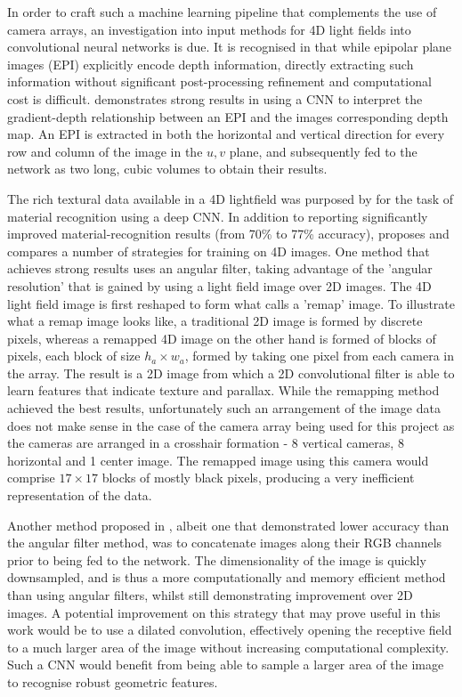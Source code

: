 \documentclass[openany]{book}
\begin{document}
In order to craft such a machine learning pipeline that complements the use of camera arrays, an investigation into input methods for 4D light fields into convolutional neural networks is due. It is recognised in \cite{sun2016lfdepthcnn} that while epipolar plane images (EPI) explicitly encode depth information, directly extracting such information without significant post-processing refinement and computational cost is difficult. \cite{sun2016lfdepthcnn} demonstrates strong results in using a CNN to interpret the gradient-depth relationship between an EPI and the images corresponding depth map. An EPI is extracted in both the horizontal and vertical direction for every row and column of the image in the $u, v$ plane, and subsequently fed to the network as two long, cubic volumes to obtain their results.

The rich textural data available in a 4D lightfield was purposed by \cite{wang2016lfcnn} for the task of material recognition using a deep CNN. In addition to reporting significantly improved material-recognition results (from 70\% to 77\% accuracy), \cite{wang2016lfcnn} proposes and compares a number of strategies for training on 4D images. One method that achieves strong results uses an angular filter, taking advantage of the 'angular resolution' that is gained by using a light field image over 2D images. The 4D light field image is first reshaped to form what \cite{wang2016lfcnn} calls a 'remap' image. To illustrate what a remap image looks like, a traditional 2D image is formed by discrete pixels, whereas a remapped 4D image on the other hand is formed of blocks of pixels, each block of size $h_a \times w_a$, formed by taking one pixel from each camera in the array. The result is a 2D image from which a 2D convolutional filter is able to learn features that indicate texture and parallax. While the remapping method achieved the best results, unfortunately such an arrangement of the image data does not make sense in the case of the camera array being used for this project as the cameras are arranged in a crosshair formation - 8 vertical cameras, 8 horizontal and 1 center image. The remapped image using this camera would comprise $17 \times 17$ blocks of mostly black pixels, producing a very inefficient representation of the data. 

Another method proposed in \cite{wang2016lfcnn}, albeit one that demonstrated lower accuracy than the angular filter method, was to concatenate images along their RGB channels prior to being fed to the network. The dimensionality of the image is quickly downsampled, and is thus a more computationally and memory efficient method than using angular filters, whilst still demonstrating improvement over 2D images. A potential improvement on this strategy that may prove useful in this work would be to use a dilated convolution, effectively opening the receptive field to a much larger area of the image without increasing computational complexity. Such a CNN would benefit from being able to sample a larger area of the image to recognise robust geometric features. 
\end{document}
